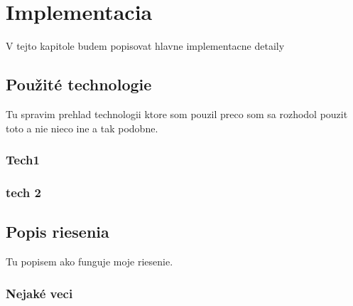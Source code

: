 \chapter{Implementacia}
	V tejto kapitole budem popisovat hlavne implementacne detaily

\section{Použité technologie}
	Tu spravim prehlad technologii ktore som pouzil preco som sa rozhodol pouzit toto a nie nieco ine a tak podobne.
	\subsection{Tech1}
	
	\subsection{tech 2}
	
\section{Popis riesenia}
	Tu popisem ako funguje moje riesenie. 
	\subsection{Nejaké veci}


